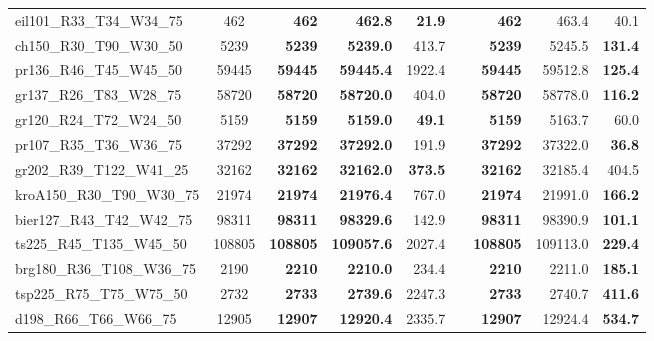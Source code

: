 \documentclass{singlecol-new}
\theoremstyle{TH}{
\newtheorem{lemma}{Lemma}
\newtheorem{theorem}[lemma]{Theorem}
\newtheorem{corrolary}[lemma]{Corrolary}
\newtheorem{conjecture}[lemma]{Conjecture}
\newtheorem{proposition}[lemma]{Proposition}
\newtheorem{claim}[lemma]{Claim}
\newtheorem{stheorem}[lemma]{Wrong Theorem}
}
\theoremstyle{THrm}{
\newtheorem{definition}{Definition}[section]
\newtheorem{question}{Question}[section]
\newtheorem{remark}{Remark}
\newtheorem{scheme}{Scheme}
}
\theoremstyle{THhit}{
\newtheorem{case}{Case}[section]
}
\begin{document}
\begin{table}[]
{\begin{tabular}{lcrrrrrrr}
		eil101\_R33\_T34\_W34\_75  & 462                  & \textbf{462}    & \textbf{462.8}    & \textbf{21.9}   &  & \textbf{462}    & 463.4            & 40.1            \\
		ch150\_R30\_T90\_W30\_50   & 5239                 & \textbf{5239}   & \textbf{5239.0}   & 413.7           &  & \textbf{5239}   & 5245.5           & \textbf{131.4}  \\
		pr136\_R46\_T45\_W45\_50   & 59445                & \textbf{59445}  & \textbf{59445.4}  & 1922.4          &  & \textbf{59445}  & 59512.8          & \textbf{125.4}  \\
		gr137\_R26\_T83\_W28\_75   & 58720                & \textbf{58720}  & \textbf{58720.0}  & 404.0           &  & \textbf{58720}  & 58778.0          & \textbf{116.2}  \\
		gr120\_R24\_T72\_W24\_50   & 5159                 & \textbf{5159}   & \textbf{5159.0}   & \textbf{49.1}   &  & \textbf{5159}   & 5163.7           & 60.0            \\
		pr107\_R35\_T36\_W36\_75   & 37292                & \textbf{37292}  & \textbf{37292.0}  & 191.9           &  & \textbf{37292}  & 37322.0          & \textbf{36.8}   \\
		gr202\_R39\_T122\_W41\_25  & 32162                & \textbf{32162}  & \textbf{32162.0}  & \textbf{373.5}  &  & \textbf{32162}  & 32185.4          & 404.5           \\
		kroA150\_R30\_T90\_W30\_75 & 21974                & \textbf{21974}  & \textbf{21976.4}  & 767.0           &  & \textbf{21974}  & 21991.0          & \textbf{166.2}  \\
		bier127\_R43\_T42\_W42\_75 & 98311                & \textbf{98311}  & \textbf{98329.6}  & 142.9           &  & \textbf{98311}  & 98390.9          & \textbf{101.1}  \\
		ts225\_R45\_T135\_W45\_50  & 108805               & \textbf{108805} & \textbf{109057.6} & 2027.4          &  & \textbf{108805} & 109113.0         & \textbf{229.4}  \\
		brg180\_R36\_T108\_W36\_75 & 2190                 & \textbf{2210}   & \textbf{2210.0}   & 234.4           &  & \textbf{2210}   & 2211.0           & \textbf{185.1}  \\
		tsp225\_R75\_T75\_W75\_50  & 2732                 & \textbf{2733}   & \textbf{2739.6}   & 2247.3          &  & \textbf{2733}   & 2740.7           & \textbf{411.6}  \\
		d198\_R66\_T66\_W66\_75    & 12905                & \textbf{12907}  & \textbf{12920.4}  & 2335.7          &  & \textbf{12907}  & 12924.4          & \textbf{534.7}  \\

\end{tabular}}
\end{table}
\end{document}
